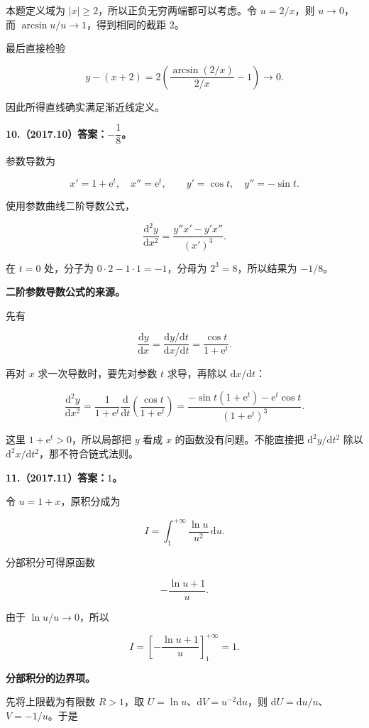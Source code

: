 \documentclass[UTF8,11pt,fontset=windows]{ctexart}
\begin{document}
本题定义域为 $|x|\ge2$，所以正负无穷两端都可以考虑。令 $u=2/x$，则 $u\to0$，而 $\arcsin u/u\to1$，得到相同的截距 $2$。

最后直接检验

$$
y-(x+2)=2\left(\frac{\arcsin(2/x)}{2/x}-1\right)\longrightarrow0.
$$

因此所得直线确实满足渐近线定义。

\clearpage

\textbf{10.（2017.10）答案：$-\dfrac18$。}

参数导数为

$$
x'=1+\mathrm e^t,\quad x''=\mathrm e^t,
\qquad y'=\cos t,\quad y''=-\sin t.
$$

使用参数曲线二阶导数公式，

$$
\frac{\mathrm d^2y}{\mathrm dx^2}
=\frac{y''x'-y'x''}{(x')^3}.
$$

在 $t=0$ 处，分子为 $0\cdot2-1\cdot1=-1$，分母为 $2^3=8$，所以结果为 $-1/8$。

\textbf{二阶参数导数公式的来源。}

先有

$$
\frac{\mathrm dy}{\mathrm dx}=\frac{\mathrm dy/\mathrm dt}{\mathrm dx/\mathrm dt}
=\frac{\cos t}{1+\mathrm e^t}.
$$

再对 $x$ 求一次导数时，要先对参数 $t$ 求导，再除以 $\mathrm dx/\mathrm dt$：

$$
\frac{\mathrm d^2y}{\mathrm dx^2}
=\frac1{1+\mathrm e^t}\frac{\mathrm d}{\mathrm dt}
\left(\frac{\cos t}{1+\mathrm e^t}\right)
=\frac{-\sin t(1+\mathrm e^t)-\mathrm e^t\cos t}{(1+\mathrm e^t)^3}.
$$

这里 $1+\mathrm e^t>0$，所以局部把 $y$ 看成 $x$ 的函数没有问题。不能直接把 $\mathrm d^2y/\mathrm dt^2$ 除以 $\mathrm d^2x/\mathrm dt^2$，那不符合链式法则。

\clearpage

\textbf{11.（2017.11）答案：$1$。}

令 $u=1+x$，原积分成为

$$
I=\int_1^{+\infty}\frac{\ln u}{u^2}\,\mathrm du.
$$

分部积分可得原函数

$$
-\frac{\ln u+1}{u}.
$$

由于 $\ln u/u\to0$，所以

$$
I=\left[-\frac{\ln u+1}{u}\right]_1^{+\infty}=1.
$$

\textbf{分部积分的边界项。}

先将上限截为有限数 $R>1$，取 $U=\ln u$、$\mathrm dV=u^{-2}\mathrm du$，则 $\mathrm dU=\mathrm du/u$、$V=-1/u$。于是
\end{document}
